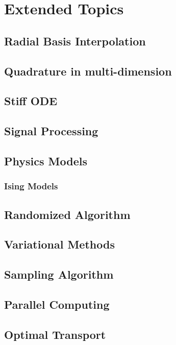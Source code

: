 \chapter{Extended Topics}

\section{Radial Basis Interpolation}

\section{Quadrature in multi-dimension}

\section{Stiff ODE}
\section{Signal Processing}
\section{Physics Models}
\subsection{Ising Models}

\section{Randomized Algorithm}

\section{Variational Methods}

\section{Sampling Algorithm}

\section{Parallel Computing}



\section{Optimal Transport}
\newpage
